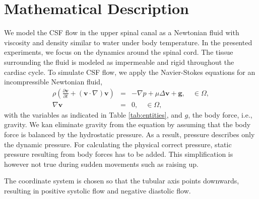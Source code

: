 \section{Mathematical Description}

We model the CSF flow in the upper spinal canal as a Newtonian fluid  with viscosity and density similar to water under body temperature. In the presented experiments, we focus on the dynamics around the spinal cord. The tissue surrounding the fluid is modeled as impermeable and rigid throughout the cardiac cycle. To simulate CSF flow, we apply the Navier-Stokes  equations for an incompressible Newtonian fluid,  
\begin{eqnarray*}
\rho \left(\frac{\partial \mathbf{v}}{\partial t} + (\mathbf{v}\cdot\nabla) \mathbf{v}\right) &=& -\nabla p + \mu \Delta \mathbf{v} + \mathbf{g}, \quad \in \Omega, \\ 
\nabla \mathbf{v} &=& 0, \quad \in \Omega, 
\end{eqnarray*}
with the variables as indicated in Table \ref{tab:entities}, and $g$, the body force, i.e., gravity. We kan eliminate gravity from the equation by assuming that the body force is balanced by the hydrostatic pressure. As a result, pressure describes only the dynamic pressure. For calculating the physical correct pressure, static pressure resulting from body forces has to be added. This simplification is however not true during sudden movements such as raising up.  

The coordinate system is chosen so that the tubular axis points downwards, resulting in  positive systolic flow and negative diastolic flow.  


